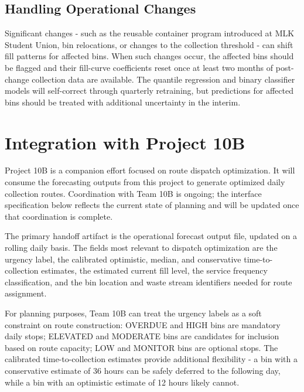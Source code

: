 \documentclass[11pt]{article}
\begin{document}
\subsection{Handling Operational Changes}

Significant changes - such as the reusable container program introduced at MLK Student
Union, bin relocations, or changes to the collection threshold - can shift fill patterns
for affected bins. When such changes occur, the affected bins should be flagged and their
fill-curve coefficients reset once at least two months of post-change collection data
are available. The quantile regression and binary classifier models will self-correct
through quarterly retraining, but predictions for affected bins should be treated with
additional uncertainty in the interim.

\newpage

\section{Integration with Project 10B}

Project 10B is a companion effort focused on route dispatch optimization. It will
consume the forecasting outputs from this project to generate optimized daily collection
routes. Coordination with Team 10B is ongoing; the interface specification below
reflects the current state of planning and will be updated once that coordination is
complete.

The primary handoff artifact is the operational forecast output file, updated on a
rolling daily basis. The fields most relevant to dispatch optimization are the urgency
label, the calibrated optimistic, median, and conservative time-to-collection estimates,
the estimated current fill level, the service frequency classification, and the bin
location and waste stream identifiers needed for route assignment.

For planning purposes, Team 10B can treat the urgency labels as a soft constraint on
route construction: OVERDUE and HIGH bins are mandatory daily stops; ELEVATED and
MODERATE bins are candidates for inclusion based on route capacity; LOW and MONITOR bins
are optional stops. The calibrated time-to-collection estimates provide additional
flexibility - a bin with a conservative estimate of 36 hours can be safely deferred to
the following day, while a bin with an optimistic estimate of 12 hours likely cannot.
\end{document}
